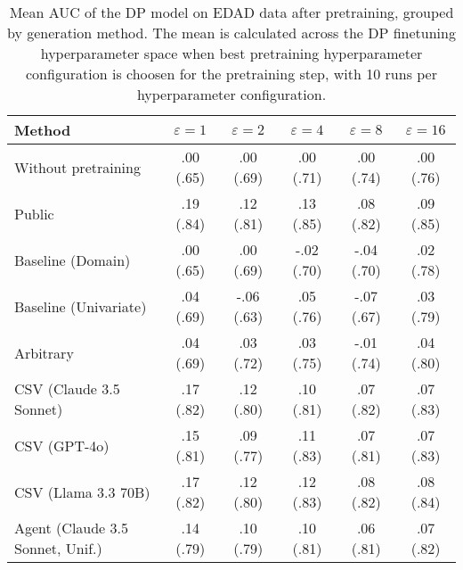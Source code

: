 \begin{table}[h!]
    \centering
    \caption{Mean AUC of the DP model on EDAD data after pretraining, grouped by generation method. The mean is calculated across the DP finetuning hyperparameter space when best pretraining hyperparameter configuration is choosen for the pretraining step, with 10 runs per hyperparameter configuration.}
    \label{tab:epsilon_comparison}
    \begin{tabular}{lccccc}
    \toprule
    Method & $\varepsilon=1$ & $\varepsilon=2$ & $\varepsilon=4$ & $\varepsilon=8$ & $\varepsilon=16$ \\
    \midrule
    Without pretraining & .00 {\small (.65)} & .00 {\small (.69)} & .00 {\small (.71)} & .00 {\small (.74)} & .00 {\small (.76)} \\
    \arrayrulecolor{black!50!}\midrule
    Public & \cellcolor{gold!30}.19 {\small (.84)} & \cellcolor{gold!30}.12 {\small (.81)} & \cellcolor{gold!30}.13 {\small (.85)} & \cellcolor{gold!30}.08 {\small (.82)} & \cellcolor{gold!30}.09 {\small (.85)} \\
    \arrayrulecolor{black!50!}\midrule
    Baseline (Domain) & .00 {\small (.65)} & .00 {\small (.69)} & -.02 {\small (.70)} & -.04 {\small (.70)} & .02 {\small (.78)} \\
    Baseline (Univariate) & .04 {\small (.69)} & -.06 {\small (.63)} & .05 {\small (.76)} & -.07 {\small (.67)} & .03 {\small (.79)} \\
    \arrayrulecolor{black!50!}\midrule
    Arbitrary & .04 {\small (.69)} & .03 {\small (.72)} & .03 {\small (.75)} & -.01 {\small (.74)} & .04 {\small (.80)} \\
    \arrayrulecolor{black!50!}\midrule
    CSV (Claude 3.5 Sonnet) & \cellcolor{silver!30}.17 {\small (.82)} & \cellcolor{silver!30}.12 {\small (.80)} & .10 {\small (.81)} & \cellcolor{silver!30}.07 {\small (.82)} & .07 {\small (.83)} \\
    CSV (GPT-4o) & .15 {\small (.81)} & .09 {\small (.77)} & .11 {\small (.83)} & \cellcolor{bronze!30}.07 {\small (.81)} & .07 {\small (.83)} \\
    CSV (Llama 3.3 70B) & \cellcolor{bronze!30}.17 {\small (.82)} & \cellcolor{bronze!30}.12 {\small (.80)} & \cellcolor{bronze!30}.12 {\small (.83)} & \cellcolor{gold!30}.08 {\small (.82)} & \cellcolor{bronze!30}.08 {\small (.84)} \\
    \arrayrulecolor{black!50!}\midrule
    Agent (Claude 3.5 Sonnet, Unif.) & .14 {\small (.79)} & .10 {\small (.79)} & .10 {\small (.81)} & .06 {\small (.81)} & .07 {\small (.82)} \\

\end{tabular}
\end{table}
